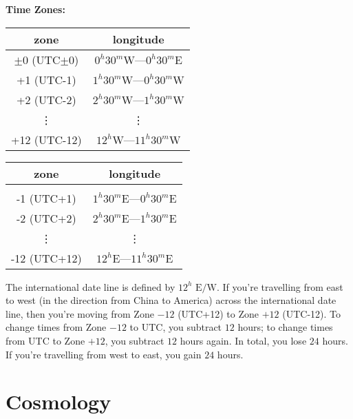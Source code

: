 \documentclass[11pt]{article}
\begin{document}
\textbf{Time Zones:} 

\begin{center}
\begin{tabular}{|c|c|}
\hline
zone & longitude \\
\hline\hline
$\pm 0$ (UTC$\pm$0) & $0^{h}30^{m}\text{W}$—$0^{h}30^{m}\text{E}$  \\
\hline
+1 (UTC-1) & $1^{h}30^{m}\text{W}$—$0^{h}30^{m}\text{W}$  \\
\hline
+2 (UTC-2) & $2^{h}30^{m}\text{W}$—$1^{h}30^{m}\text{W}$  \\
\hline
   \vdots  &\vdots  \\
\hline
+12 (UTC-12) & $12^{h}\text{W}$—$11^{h}30^{m}\text{W}$  \\
\hline
\end{tabular}
\begin{tabular}{|c|c|}
\hline
zone & longitude \\
\hline\hline
&  \\
\hline
-1 (UTC+1) & $1^{h}30^{m}\text{E}$—$0^{h}30^{m}\text{E}$  \\
\hline
-2 (UTC+2) & $2^{h}30^{m}\text{E}$—$1^{h}30^{m}\text{E}$  \\
\hline
   \vdots  &\vdots  \\
\hline
-12 (UTC+12) & $12^{h}\text{E}$—$11^{h}30^{m}\text{E}$  \\
\hline
\end{tabular}
\end{center}




The international date line is defined by $12^{h}\text{ E/W}$. If you're travelling from east to west (in the direction from China to America) across the international date line, then you're moving from Zone $-12$ (UTC+12) to Zone $+12$ (UTC-12). To change times from Zone $-12$ to UTC, you subtract $12$ hours; to change times from UTC to Zone $+12$, you subtract $12$ hours again. In total, you lose $24$ hours. If you're travelling from west to east, you gain $24$ hours.

\section{Cosmology}
\end{document}
